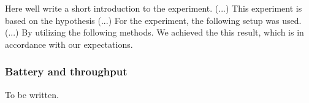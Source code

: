 Here well write a short introduction to the experiment. 
(...)
This experiment is based on the hypothesis
(...)
For the experiment, the following setup was used.
(...)
By utilizing the following methods. We achieved the this result, which is in accordance with our expectations.


\subsubsection{Battery and throughput} %
\label{ssub:battery_and_throughput}

To be written.

